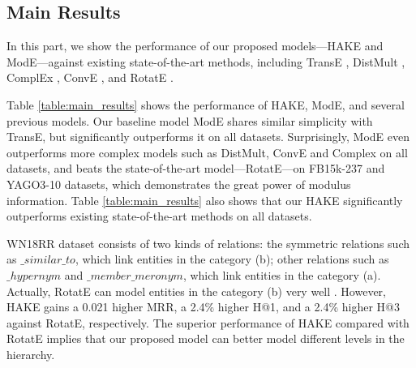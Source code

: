 \documentclass[letterpaper]{article} \usepackage{aaai20}  \usepackage{times}  \usepackage{helvet} \usepackage{courier}  \usepackage[hyphens]{url}  \usepackage{graphicx} \urlstyle{rm} \def\UrlFont{\rm}  \usepackage{graphicx}  \frenchspacing  \setlength{\pdfpagewidth}{8.5in}  \setlength{\pdfpageheight}{11in}
\newcommand{\citep}{\cite}
\begin{document}
\subsection{Main Results}
In this part, we show the performance of our proposed models---HAKE and ModE---against existing state-of-the-art methods, including TransE \citep{transe}, DistMult \citep{distmult}, ComplEx \citep{complex}, ConvE \citep{conve}, and RotatE \citep{rotate}. 

Table \ref{table:main_results} shows the performance of HAKE, ModE, and several previous models. Our baseline model ModE shares similar simplicity with TransE, but significantly outperforms it on all datasets. Surprisingly, ModE even outperforms more complex models such as DistMult, ConvE and Complex on all datasets, and beats the state-of-the-art model---RotatE---on FB15k-237 and YAGO3-10 datasets, which demonstrates the great power of modulus information. Table \ref{table:main_results} also shows that our HAKE significantly outperforms existing state-of-the-art methods on all datasets. 

\begin{table}[ht]
    \centering
    \caption{Statistics of datasets. The symbols \#E and \#R denote the number of entities and relations, respectively. \#TR, \#VA, and \#TE denote the size of train set, validation set, and test set, respectively.}
    \label{table:datasets}
\end{table}

WN18RR dataset consists of two kinds of relations: the symmetric relations such as $\_similar\_to$, which link entities in the category (b); other relations such as $\_hypernym$ and $\_member\_meronym$, which link entities in the category (a). Actually, RotatE can model entities in the category (b) very well \citep{rotate}. However, HAKE gains a 0.021 higher MRR, a 2.4\% higher H@1, and a 2.4\% higher H@3 against RotatE, respectively. The superior performance of HAKE compared with RotatE implies that our proposed model can better model different levels in the hierarchy.
\end{document}
